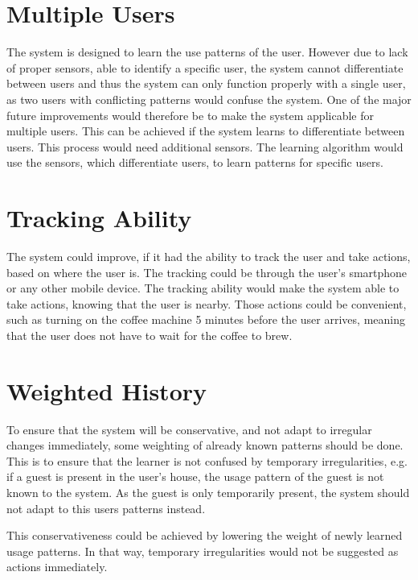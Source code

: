 \section{Multiple Users}
The system is designed to learn the use patterns of the user. However due to lack of proper sensors, able to identify a specific user, the system cannot differentiate between users and thus the system can only function properly with a single user, as two users with conflicting patterns would confuse the system. One of the major future improvements would therefore be to make the system applicable for multiple users. This can be achieved if the system learns to differentiate between users. This process would need additional sensors. The learning algorithm would use the sensors, which differentiate users, to learn patterns for specific users.

\section{Tracking Ability}
The system could improve, if it had the ability to track the user and take actions, based on where the user is. The tracking could be through the user's smartphone or any other mobile device. The tracking ability would make the system able to take actions, knowing that the user is nearby. Those actions could be  convenient, such as turning on the coffee machine 5 minutes before the user arrives, meaning that the user does not have to wait for the coffee to brew.

\section{Weighted History}
To ensure that the system will be conservative, and not adapt to irregular changes immediately, some weighting of already known patterns should be done. This is to ensure that the learner is not confused by temporary irregularities, e.g. if a guest is present in the user's house, the usage pattern of the guest is not known to the system. As the guest is only temporarily present, the system should not adapt to this users patterns instead.

This conservativeness could be achieved by lowering the weight of newly learned usage patterns. In that way, temporary irregularities would not be suggested as actions immediately.
